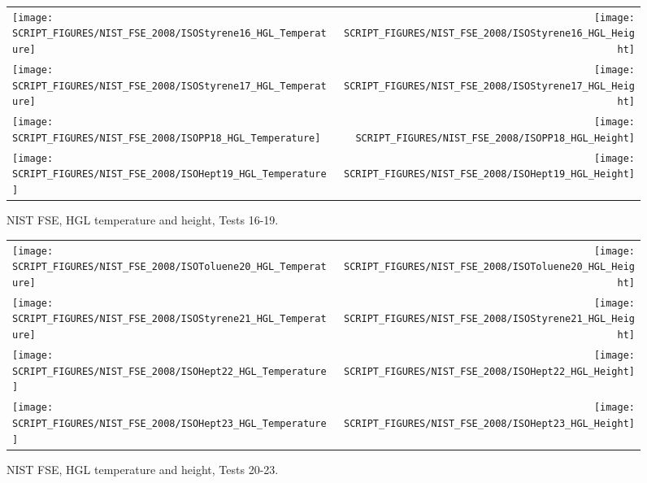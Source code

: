 \begin{figure}[p]
\begin{tabular*}{\textwidth}{l@{\extracolsep{\fill}}r}
\texttt{[image: SCRIPT\_FIGURES/NIST\_FSE\_2008/ISOStyrene16\_HGL\_Temperature]} &
\texttt{[image: SCRIPT\_FIGURES/NIST\_FSE\_2008/ISOStyrene16\_HGL\_Height]} \\
\texttt{[image: SCRIPT\_FIGURES/NIST\_FSE\_2008/ISOStyrene17\_HGL\_Temperature]} &
\texttt{[image: SCRIPT\_FIGURES/NIST\_FSE\_2008/ISOStyrene17\_HGL\_Height]} \\
\texttt{[image: SCRIPT\_FIGURES/NIST\_FSE\_2008/ISOPP18\_HGL\_Temperature]} &
\texttt{[image: SCRIPT\_FIGURES/NIST\_FSE\_2008/ISOPP18\_HGL\_Height]} \\
\texttt{[image: SCRIPT\_FIGURES/NIST\_FSE\_2008/ISOHept19\_HGL\_Temperature]} &
\texttt{[image: SCRIPT\_FIGURES/NIST\_FSE\_2008/ISOHept19\_HGL\_Height]}
\end{tabular*}
\caption[NIST FSE, HGL temperature and height, Tests 16-19]
{NIST FSE, HGL temperature and height, Tests 16-19.}
\label{NIST_FSE_2008_HGL_Temp_3}
\end{figure}

\begin{figure}[p]
\begin{tabular*}{\textwidth}{l@{\extracolsep{\fill}}r}
\texttt{[image: SCRIPT\_FIGURES/NIST\_FSE\_2008/ISOToluene20\_HGL\_Temperature]} &
\texttt{[image: SCRIPT\_FIGURES/NIST\_FSE\_2008/ISOToluene20\_HGL\_Height]} \\
\texttt{[image: SCRIPT\_FIGURES/NIST\_FSE\_2008/ISOStyrene21\_HGL\_Temperature]} &
\texttt{[image: SCRIPT\_FIGURES/NIST\_FSE\_2008/ISOStyrene21\_HGL\_Height]} \\
\texttt{[image: SCRIPT\_FIGURES/NIST\_FSE\_2008/ISOHept22\_HGL\_Temperature]} &
\texttt{[image: SCRIPT\_FIGURES/NIST\_FSE\_2008/ISOHept22\_HGL\_Height]} \\
\texttt{[image: SCRIPT\_FIGURES/NIST\_FSE\_2008/ISOHept23\_HGL\_Temperature]} &
\texttt{[image: SCRIPT\_FIGURES/NIST\_FSE\_2008/ISOHept23\_HGL\_Height]}
\end{tabular*}
\caption[NIST FSE, HGL temperature and height, Tests 20-23]
{NIST FSE, HGL temperature and height, Tests 20-23.}
\label{NIST_FSE_2008_HGL_Temp_4}
\end{figure}

